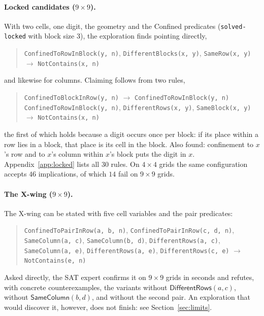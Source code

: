 \documentclass[11pt,a4paper]{article}
\theoremstyle{definition}
\theoremstyle{remark}
\newcommand{\code}[1]{\texttt{#1}}
\newcommand{\pred}[1]{\mathsf{#1}}
\begin{document}
\paragraph{Locked candidates ($9 \times 9$).}
With two cells, one digit, the geometry and the Confined predicates (\code{solved-locked} with block size $3$), the exploration finds pointing directly,
\begin{quote}\small\raggedright
\texttt{ConfinedToRowInBlock(y,~n)}, \allowbreak \texttt{DifferentBlocks(x,~y)}, \allowbreak \texttt{SameRow(x,~y)} \;$\to$\; \texttt{NotContains(x,~n)}
\end{quote}
and likewise for columns. Claiming follows from two rules,
\begin{quote}\small\raggedright
\texttt{ConfinedToBlockInRow(y,~n)} \;$\to$\; \texttt{ConfinedToRowInBlock(y,~n)}\\
\texttt{ConfinedToRowInBlock(y,~n)}, \allowbreak \texttt{DifferentRows(x,~y)}, \allowbreak \texttt{SameBlock(x,~y)} \;$\to$\; \texttt{NotContains(x,~n)}
\end{quote}
the first of which holds because a digit occurs once per block: if its place within a row lies in a block, that place is its cell in the block. Also found: confinement to $x$'s row and to $x$'s column within $x$'s block puts the digit in $x$. Appendix~\ref{app:locked} lists all 30 rules. On $4 \times 4$ grids the same configuration accepts $46$ implications, of which $14$ fail on $9 \times 9$ grids.

\paragraph{The X-wing ($9 \times 9$).}
The X-wing can be stated with five cell variables and the pair predicates:
\begin{quote}\small\raggedright
\texttt{ConfinedToPairInRow(a,~b,~n)}, \allowbreak \texttt{ConfinedToPairInRow(c,~d,~n)}, \allowbreak \texttt{SameColumn(a,~c)}, \allowbreak \texttt{SameColumn(b,~d)}, \allowbreak \texttt{DifferentRows(a,~c)}, \allowbreak \texttt{SameColumn(a,~e)}, \allowbreak \texttt{DifferentRows(a,~e)}, \allowbreak \texttt{DifferentRows(c,~e)} \;$\to$\; \texttt{NotContains(e,~n)}
\end{quote}
Asked directly, the SAT expert confirms it on $9 \times 9$ grids in seconds and refutes, with concrete counterexamples, the variants without $\pred{DifferentRows}(a, c)$, without $\pred{SameColumn}(b, d)$, and without the second pair. An exploration that would discover it, however, does not finish: see Section~\ref{sec:limits}.
\end{document}
